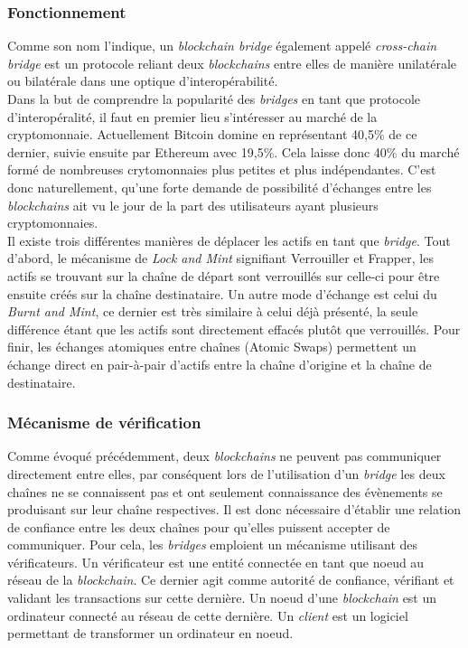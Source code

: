 
\subsubsection{Fonctionnement}

Comme son nom l’indique, un \textit{\gls{blockchain} bridge} également appelé \textit{\gls{cross-chain} bridge} est un protocole reliant deux \textit{\gls{blockchain}s} entre elles de manière unilatérale ou bilatérale dans une optique d’interopérabilité.\\

Dans la but de comprendre la popularité des \textit{bridges} en tant que protocole d’interopéralité, il faut en premier lieu s’intéresser au marché de la cryptomonnaie. Actuellement \gls{Bitcoin} domine en représentant 40,5\% de ce dernier, suivie ensuite par \gls{Ethereum} avec 19,5\%. Cela laisse donc 40\% du marché formé de nombreuses crytomonnaies plus petites et plus indépendantes. C’est donc naturellement, qu’une forte demande de possibilité d’échanges entre les \textit{\gls{blockchain}s} ait vu le jour de la part des utilisateurs ayant plusieurs cryptomonnaies\cite{Ngrave}.\\

Il existe trois différentes manières de déplacer les \gls{actif}s en tant que \textit{bridge}. Tout d’abord, le mécanisme de \textit{Lock and Mint} signifiant Verrouiller et Frapper, les \gls{actif}s se trouvant sur la chaîne de départ sont verrouillés sur celle-ci pour être ensuite créés sur la chaîne destinataire. Un autre mode d'échange est celui du \textit{Burnt and Mint}, ce dernier est très similaire à celui déjà présenté, la seule différence étant que les \gls{actif}s sont directement effacés plutôt que verrouillés. Pour finir, les échanges atomiques entre chaînes (Atomic Swaps) permettent un échange direct en pair-à-pair d'\gls{actif}s entre la chaîne d’origine et la chaîne de destinataire.\cite{EthereumMechanism}

\subsubsection{Mécanisme de vérification}

Comme évoqué précédemment, deux \textit{\gls{blockchain}s} ne peuvent pas communiquer directement entre elles, par conséquent lors de l’utilisation d’un \textit{bridge} les deux chaînes ne se connaissent pas et ont seulement connaissance des évènements se produisant sur leur chaîne respectives. Il est donc nécessaire d’établir une relation de confiance entre les deux chaînes pour qu’elles puissent accepter de communiquer. Pour cela, les \textit{bridges} emploient un mécanisme utilisant des \gls{vérificateur}s. Un \gls{vérificateur} est une entité connectée en tant que \gls{noeud} au réseau de la \textit{blockchain}. Ce dernier agit comme autorité de confiance, vérifiant et validant les transactions sur cette dernière. Un noeud d'une \textit{blockchain} est un ordinateur connecté au réseau de cette dernière. Un \textit{client} est un logiciel permettant de transformer un ordinateur en noeud. \cite{EthereumNodeClient} \\


